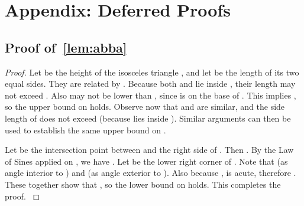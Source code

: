 \documentclass[runningheads,a4paper]{llncs}
\newcommand{\ABox}{
\raisebox{3pt}{\framebox[6pt]{\rule{6pt}{0pt}}}
}
\begin{document}
\newpage
\section*{Appendix: Deferred Proofs}
\label{sec:defer}



\subsection{Proof of~\autoref{lem:abba}}

\abbalemma*
\begin{proof}
Let  be the height of the isosceles triangle , and let  be the length of its two equal sides. They are related by . Because both  and  lie inside , their length may not exceed . Also  may not be lower than , since  is on the base of . This implies 
, so the upper bound on  holds.  
Observe now that  and  are similar, and the side length of   does not exceed  (because  lies inside ). Similar arguments can then be used to establish the same upper bound on . 

Let  be the intersection point between  and the right side of 
. Then . By the Law of Sines applied on , we have 
. Let  be the lower right corner of . Note that  (as angle interior to ) and  (as angle exterior to ). Also because ,  is acute, therefore . These together show that , so the lower bound on  holds. This completes the proof. 
{\hfill\ABox}\end{proof}
\end{document}
